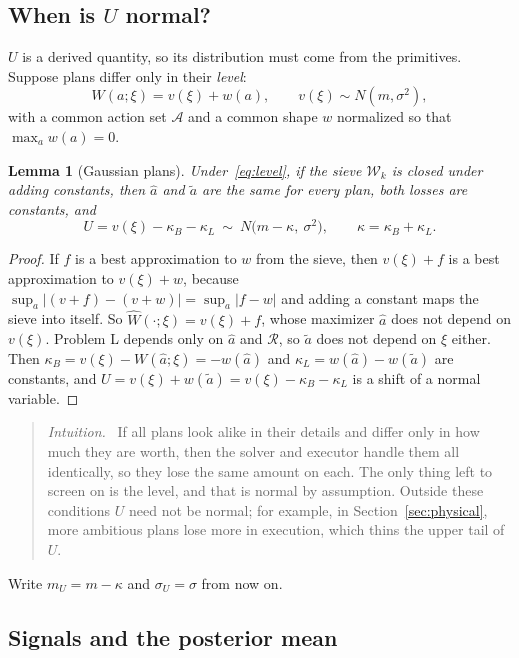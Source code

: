 \documentclass[11pt]{article}
\newtheorem*{lemma*}{Lemma}
\theoremstyle{remark}
\newenvironment{intuition}{\begin{quote}\small\color{muted}\textit{Intuition.}\ }{\end{quote}}
\newcommand{\Rcal}{\mathcal{R}}
\newcommand{\Acal}{\mathcal{A}}
\begin{document}
\subsection{\texorpdfstring{When is $U$ normal?}{When is U normal?}}

$U$ is a derived quantity, so its distribution must come from the primitives. Suppose plans differ only in their \emph{level}:
\begin{equation}\label{eq:level}
W(a;\xi)=v(\xi)+w(a),\qquad v(\xi)\sim N(m,\sigma^2),
\end{equation}
with a common action set $\Acal$ and a common shape $w$ normalized so that $\max_aw(a)=0$.

\begin{lemma*}[Gaussian plans]
Under~\eqref{eq:level}, if the sieve $\mathcal{W}_k$ is closed under adding constants, then $\hat a$ and $\tilde a$ are the same for every plan, both losses are constants, and
\[
U=v(\xi)-\kappa_B-\kappa_L\ \sim\ N\big(m-\kappa,\ \sigma^2\big),\qquad\kappa=\kappa_B+\kappa_L.
\]
\end{lemma*}

\begin{proof}
If $f$ is a best approximation to $w$ from the sieve, then $v(\xi)+f$ is a best approximation to $v(\xi)+w$, because $\sup_a|(v+f)-(v+w)|=\sup_a|f-w|$ and adding a constant maps the sieve into itself. So $\hat W(\cdot;\xi)=v(\xi)+f$, whose maximizer $\hat a$ does not depend on $v(\xi)$. Problem L depends only on $\hat a$ and $\Rcal$, so $\tilde a$ does not depend on $\xi$ either. Then $\kappa_B=v(\xi)-W(\hat a;\xi)=-w(\hat a)$ and $\kappa_L=w(\hat a)-w(\tilde a)$ are constants, and $U=v(\xi)+w(\tilde a)=v(\xi)-\kappa_B-\kappa_L$ is a shift of a normal variable.
\end{proof}

\begin{intuition}
If all plans look alike in their details and differ only in how much they are worth, then the solver and executor handle them all identically, so they lose the same amount on each. The only thing left to screen on is the level, and that is normal by assumption. Outside these conditions $U$ need not be normal; for example, in Section~\ref{sec:physical}, more ambitious plans lose more in execution, which thins the upper tail of $U$.
\end{intuition}

Write $m_U=m-\kappa$ and $\sigma_U=\sigma$ from now on.

\subsection{Signals and the posterior mean}
\end{document}
